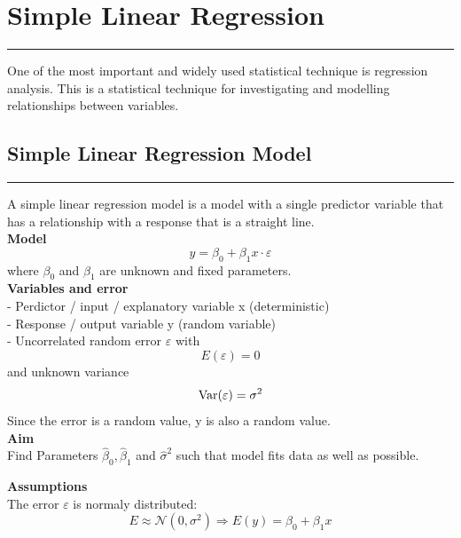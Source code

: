 \section{Simple Linear Regression}
\noindent\rule[\linienAbstand]{\linewidth}{\linienDickeDick}
One of the most important and widely used statistical technique is regression analysis. This is a statistical technique for investigating and modelling relationships between variables.

\subsection{Simple Linear Regression Model}
\noindent\rule[\linienAbstand]{\linewidth}{\linienDicke}
A simple linear regression model is a model with a single predictor variable that has a relationship with a response that is a straight line.\\

\textbf{Model}
\begin{equation}
  y = \beta_0 + \beta_1x \cdot \varepsilon
\end{equation}
where $\beta_0$ and $\beta_1$ are unknown and fixed parameters.\\

\textbf{Variables and error}\\
- Perdictor / input / explanatory variable x (deterministic)\\
- Response / output variable y (random variable)\\
- Uncorrelated random error $\varepsilon $ with
\begin{equation}
  E(\varepsilon ) = 0
\end{equation}
and unknown variance
\begin{equation}
  \textup{Var}(\varepsilon ) = \sigma^2
\end{equation}
Since the error is a random value, y is also a random value.\\

\textbf{Aim}\\
Find Parameters $\hat{\beta}_0, \hat{\beta}_1$ and $\hat{\sigma}^2$ such that model fits data as well as possible.

\textbf{Assumptions}\\
The error $\varepsilon $ is normaly distributed:
\begin{equation}
  E \approx \mathcal{N}(0, \sigma^2) \Rightarrow E(y) = \beta_0 + \beta_1 x
\end{equation}

